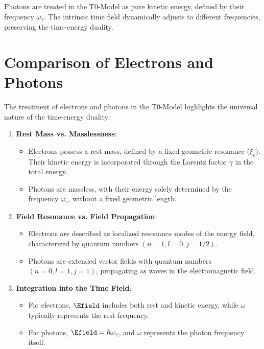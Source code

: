 \begin{important}
	Photons are treated in the T0-Model as pure kinetic energy, defined by their frequency \(\omega_\gamma\). The intrinsic time field dynamically adjusts to different frequencies, preserving the time-energy duality.
\end{important}

\section{Comparison of Electrons and Photons}
\label{sec:comparison}

The treatment of electrons and photons in the T0-Model highlights the universal nature of the time-energy duality:

\begin{enumerate}
	\item \textbf{Rest Mass vs. Masslessness}:
	\begin{itemize}
		\item Electrons possess a rest mass, defined by a fixed geometric resonance (\(\xi_e\)). Their kinetic energy is incorporated through the Lorentz factor \(\gamma\) in the total energy.
		\item Photons are massless, with their energy solely determined by the frequency \(\omega_\gamma\), without a fixed geometric length.
	\end{itemize}
	
	\item \textbf{Field Resonance vs. Field Propagation}:
	\begin{itemize}
		\item Electrons are described as localized resonance modes of the energy field, characterized by quantum numbers \((n=1, l=0, j=1/2)\).
		\item Photons are extended vector fields with quantum numbers \((n=0, l=1, j=1)\), propagating as waves in the electromagnetic field.
	\end{itemize}
	
	\item \textbf{Integration into the Time Field}:
	\begin{itemize}
		\item For electrons, \( \Efield \) includes both rest and kinetic energy, while \(\omega\) typically represents the rest frequency.
		\item For photons, \( \Efield = \hbar \omega_\gamma \), and \(\omega\) represents the photon frequency itself.
	\end{itemize}
\end{enumerate}


